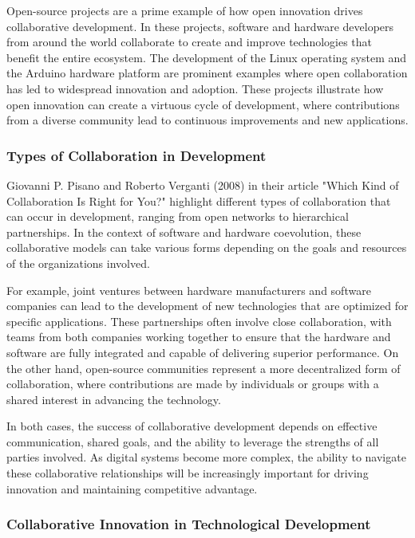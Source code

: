 \documentclass[12pt,twoside]{article}
\begin{document}
Open-source projects are a prime example of how open innovation drives collaborative development. In these projects, software and hardware developers from around the world collaborate to create and improve technologies that benefit the entire ecosystem. The development of the Linux operating system and the Arduino hardware platform are prominent examples where open collaboration has led to widespread innovation and adoption. These projects illustrate how open innovation can create a virtuous cycle of development, where contributions from a diverse community lead to continuous improvements and new applications.

\subsubsection{Types of Collaboration in Development}

Giovanni P. Pisano and Roberto Verganti (2008) in their article "Which Kind of Collaboration Is Right for You?" highlight different types of collaboration that can occur in development, ranging from open networks to hierarchical partnerships. In the context of software and hardware coevolution, these collaborative models can take various forms depending on the goals and resources of the organizations involved.

For example, joint ventures between hardware manufacturers and software companies can lead to the development of new technologies that are optimized for specific applications. These partnerships often involve close collaboration, with teams from both companies working together to ensure that the hardware and software are fully integrated and capable of delivering superior performance. On the other hand, open-source communities represent a more decentralized form of collaboration, where contributions are made by individuals or groups with a shared interest in advancing the technology.

In both cases, the success of collaborative development depends on effective communication, shared goals, and the ability to leverage the strengths of all parties involved. As digital systems become more complex, the ability to navigate these collaborative relationships will be increasingly important for driving innovation and maintaining competitive advantage.

\subsubsection{Collaborative Innovation in Technological Development}
\end{document}
